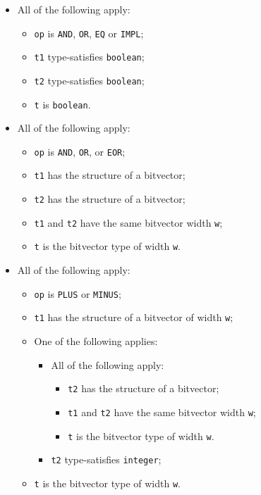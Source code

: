 \documentclass{book}
\begin{document}
\begin{itemize}
  \item All of the following apply:
    \begin{itemize}
    \item \texttt{op} is \texttt{AND}, \texttt{OR}, \texttt{EQ} or \texttt{IMPL}; 
    \item \texttt{t1} type-satisfies \texttt{boolean};
    \item \texttt{t2} type-satisfies \texttt{boolean};
    \item \texttt{t} is \texttt{boolean}.
    \end{itemize}

  \item All of the following apply:
    \begin{itemize}
    \item \texttt{op} is \texttt{AND}, \texttt{OR}, or \texttt{EOR};
    \item \texttt{t1} has the structure of a bitvector;
    \item \texttt{t2} has the structure of a bitvector;
    \item \texttt{t1} and \texttt{t2} have the same bitvector width \texttt{w};
    \item \texttt{t} is the bitvector type of width \texttt{w}.
    \end{itemize}

  \item All of the following apply:
    \begin{itemize}
    \item \texttt{op} is \texttt{PLUS} or \texttt{MINUS};
    \item \texttt{t1} has the structure of a bitvector of width \texttt{w};
    \item One of the following applies:
      \begin{itemize}
	    \item All of the following apply:
          \begin{itemize}
		    \item \texttt{t2} has the structure of a bitvector;
    		\item \texttt{t1} and \texttt{t2} have the same bitvector width \texttt{w};
    		\item \texttt{t} is the bitvector type of width \texttt{w}.
          \end{itemize}    
    	\item \texttt{t2} type-satisfies \texttt{integer};
      \end{itemize}    
    \item \texttt{t} is the bitvector type of width \texttt{w}.
    \end{itemize}


\end{itemize}
\end{document}
